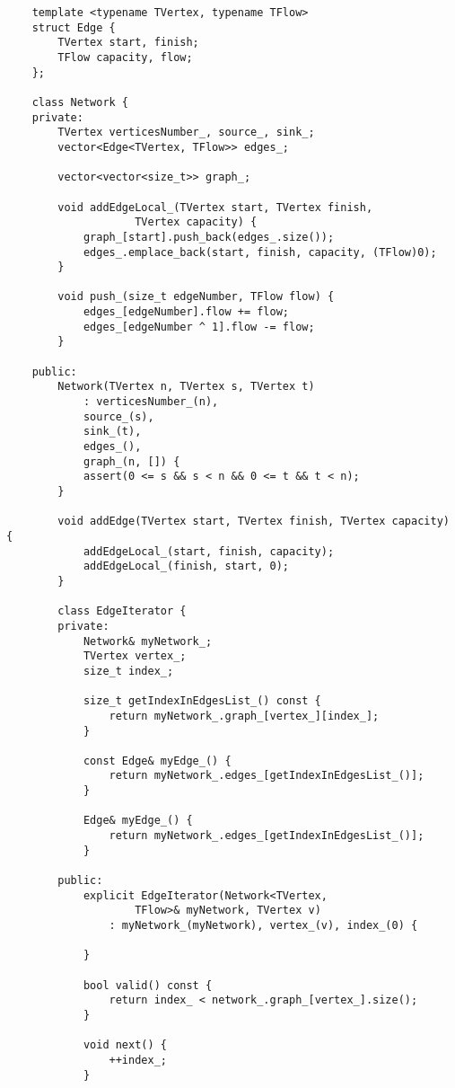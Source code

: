 \begin{lstlisting}
    template <typename TVertex, typename TFlow>
    struct Edge {
        TVertex start, finish;
        TFlow capacity, flow;
    };

    class Network {
    private:
        TVertex verticesNumber_, source_, sink_;
        vector<Edge<TVertex, TFlow>> edges_;

        vector<vector<size_t>> graph_;

        void addEdgeLocal_(TVertex start, TVertex finish, 
                    TVertex capacity) {
            graph_[start].push_back(edges_.size());
            edges_.emplace_back(start, finish, capacity, (TFlow)0);
        }

        void push_(size_t edgeNumber, TFlow flow) {
            edges_[edgeNumber].flow += flow;
            edges_[edgeNumber ^ 1].flow -= flow;
        }

    public:
        Network(TVertex n, TVertex s, TVertex t)
            : verticesNumber_(n),
            source_(s),
            sink_(t),
            edges_(),
            graph_(n, []) {
            assert(0 <= s && s < n && 0 <= t && t < n);
        }

        void addEdge(TVertex start, TVertex finish, TVertex capacity) {
            addEdgeLocal_(start, finish, capacity);
            addEdgeLocal_(finish, start, 0);
        }

        class EdgeIterator {
        private:
            Network& myNetwork_;
            TVertex vertex_;
            size_t index_;

            size_t getIndexInEdgesList_() const {
                return myNetwork_.graph_[vertex_][index_];
            }

            const Edge& myEdge_() {
                return myNetwork_.edges_[getIndexInEdgesList_()];
            }

            Edge& myEdge_() {
                return myNetwork_.edges_[getIndexInEdgesList_()];
            }

        public:
            explicit EdgeIterator(Network<TVertex, 
                    TFlow>& myNetwork, TVertex v)
                : myNetwork_(myNetwork), vertex_(v), index_(0) {

            }

            bool valid() const {
                return index_ < network_.graph_[vertex_].size();
            }

            void next() {
                ++index_;
            }


\end{lstlisting}
